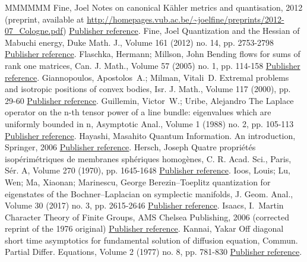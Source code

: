 \documentclass[11pt]{article}
\theoremstyle{definition}
\numberwithin{equation}{section}
\numberwithin{figure}{section}
\numberwithin{table}{section}
\newcommand\< {\mathcal{h}}
\renewcommand\> {\mathcal{i}}
\begin{document}
\begin{thebibliography}{MMMMMM}
 Fine, Joel Notes on canonical Kähler metrics and quantisation, 2012 (preprint, available at \url{http://homepages.vub.ac.be/~joelfine/preprints/2012-07_Cologne.pdf}) \href{https://ahl.centre-mersenne.org/item/AHL_2020__3__1343_0/#Fine-lectures}{Publisher reference}.
 Fine, Joel Quantization and the Hessian of Mabuchi energy, Duke Math. J., Volume 161 (2012) no. 14, pp. 2753-2798 \href{https://ahl.centre-mersenne.org/item/AHL_2020__3__1343_0/#Fin12}{Publisher reference}.
 Flaschka, Hermann; Millson, John Bending flows for sums of rank one matrices, Can. J. Math., Volume 57 (2005) no. 1, pp. 114-158 \href{https://ahl.centre-mersenne.org/item/AHL_2020__3__1343_0/#FM}{Publisher reference}.
 Giannopoulos, Apostolos A.; Milman, Vitali D. Extremal problems and isotropic positions of convex bodies, Isr. J. Math., Volume 117 (2000), pp. 29-60 \href{https://ahl.centre-mersenne.org/item/AHL_2020__3__1343_0/#GM}{Publisher reference}.
 Guillemin, Victor W.; Uribe, Alejandro The Laplace operator on the n-th tensor power of a line bundle: eigenvalues which are uniformly bounded in n, Asymptotic Anal., Volume 1 (1988) no. 2, pp. 105-113 \href{https://ahl.centre-mersenne.org/item/AHL_2020__3__1343_0/#GU88}{Publisher reference}.
 Hayashi, Masahito Quantum Information. An introduction, Springer, 2006 \href{https://ahl.centre-mersenne.org/item/AHL_2020__3__1343_0/#Hayashi}{Publisher reference}.
 Hersch, Joseph Quatre propriétés isopérimétriques de membranes sphériques homogènes, C. R. Acad. Sci., Paris, Sér. A, Volume 270 (1970), pp. 1645-1648 \href{https://ahl.centre-mersenne.org/item/AHL_2020__3__1343_0/#Her70}{Publisher reference}.
 Ioos, Louis; Lu, Wen; Ma, Xiaonan; Marinescu, George Berezin–Toeplitz quantization for eigenstates of the Bochner–Laplacian on symplectic manifolds, J. Geom. Anal., Volume 30 (2017) no. 3, pp. 2615-2646 \href{https://ahl.centre-mersenne.org/item/AHL_2020__3__1343_0/#ILMM17}{Publisher reference}.
 Isaacs, I. Martin Character Theory of Finite Groups, AMS Chelsea Publishing, 2006 (corrected reprint of the 1976 original) \href{https://ahl.centre-mersenne.org/item/AHL_2020__3__1343_0/#Isaacs}{Publisher reference}.
 Kannai, Yakar Off diagonal short time asymptotics for fundamental solution of diffusion equation, Commun. Partial Differ. Equations, Volume 2 (1977) no. 8, pp. 781-830 \href{https://ahl.centre-mersenne.org/item/AHL_2020__3__1343_0/#Kannai}{Publisher reference}.

\end{thebibliography}
\end{document}
